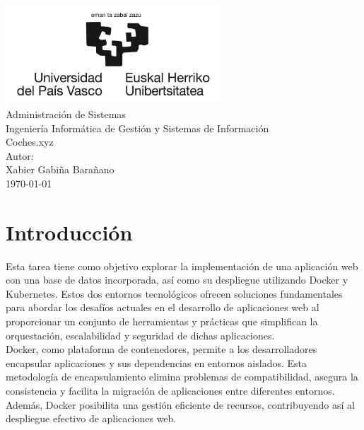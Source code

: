 \documentclass{report}
\begin{document}
    \begin{titlepage}
        \centering
        \includegraphics[width=0.6\textwidth]{./img/logo.jpg}\\
        \vspace{1cm}
        \LARGE Administración de Sistemas\\
        \vspace{0.5cm}
        \Large Ingeniería Informática de Gestión y Sistemas de Información\\
        \vspace{3cm}
        \Huge Coches.xyz\\
        \vspace{2.5cm}
        \Large Autor:\\
        \vspace{0.2cm}
        \large Xabier Gabiña Barañano\\
        \vfill
        \today
    \end{titlepage}
    \tableofcontents
    \chapter{Introducción}
        Esta tarea tiene como objetivo explorar la implementación de una aplicación web con una base de datos incorporada, así como su despliegue utilizando Docker y Kubernetes. Estos dos entornos tecnológicos ofrecen soluciones fundamentales para abordar los desafíos actuales en el desarrollo de aplicaciones web al proporcionar un conjunto de herramientas y prácticas que simplifican la orquestación, escalabilidad y seguridad de dichas aplicaciones.\\

        Docker, como plataforma de contenedores, permite a los desarrolladores encapsular aplicaciones y sus dependencias en entornos aislados. Esta metodología de encapsulamiento elimina problemas de compatibilidad, asegura la consistencia y facilita la migración de aplicaciones entre diferentes entornos. Además, Docker posibilita una gestión eficiente de recursos, contribuyendo así al despliegue efectivo de aplicaciones web.\\
        
\end{document}
